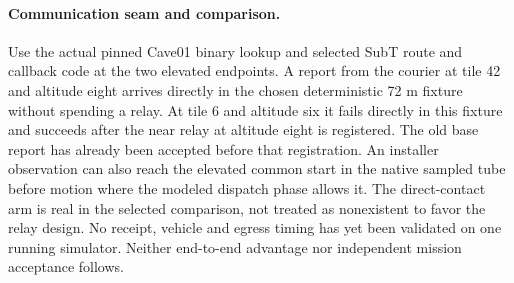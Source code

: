 \documentclass{article}
\begin{document}
\paragraph{Communication seam and comparison.}
Use the actual pinned Cave01 binary lookup and selected
SubT route and callback code at the two elevated endpoints.
A report from the courier at tile 42 and altitude eight
arrives directly in the chosen deterministic 72 m fixture
without spending a relay. At tile 6 and altitude six
it fails directly in this fixture and succeeds after the
near relay at altitude eight is registered. The old base
report has already been accepted before that registration.
An installer observation can also reach the elevated
common start in the native sampled tube before motion
where the modeled dispatch phase allows it.
The direct-contact arm is real in the selected comparison,
not treated as nonexistent to favor the relay design.
No receipt, vehicle and egress timing has yet been
validated on one running simulator. Neither end-to-end
advantage nor independent mission acceptance follows.
\end{document}
